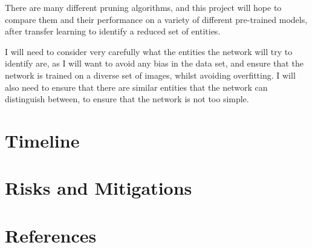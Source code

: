 \documentclass{article}
\begin{document}
There are many different pruning algorithms, and this project will hope to compare
them and their performance on a variety of different pre-trained models, after
transfer learning to identify a reduced set of entities.

I will need to consider very carefully what the entities the network will try
to identify are, as I will want to avoid any bias in the data set, and
ensure that the network is trained on a diverse set of images, whilst avoiding
overfitting. I will also need to ensure that there are similar entities that the
network can distinguish between, to ensure that the network is not too simple.



\pagebreak
\section{Timeline}

\lipsum[1]\lipsum[2]

\pagebreak
\section{Risks and Mitigations}

\lipsum[1]\lipsum[2]

\pagebreak
\section{References}

\lipsum[1]\lipsum[2]
\end{document}
